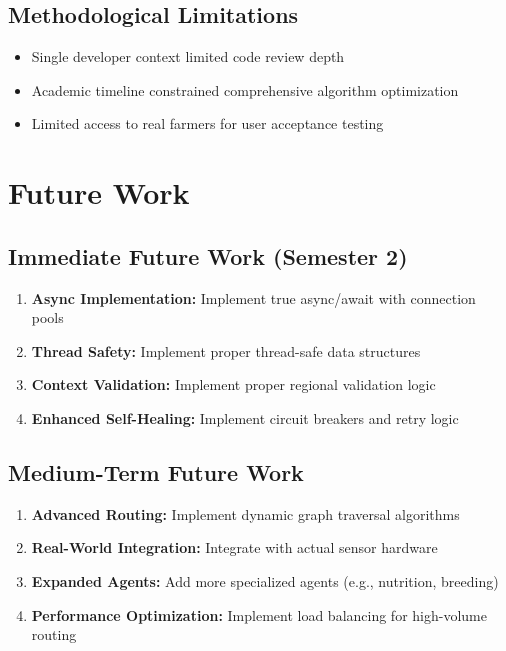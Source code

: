\subsection{Methodological Limitations}

\begin{itemize}
    \item Single developer context limited code review depth
    \item Academic timeline constrained comprehensive algorithm optimization
    \item Limited access to real farmers for user acceptance testing
\end{itemize}

\section{Future Work}

\subsection{Immediate Future Work (Semester 2)}

\begin{enumerate}
    \item \textbf{Async Implementation:} Implement true async/await with connection pools
    \item \textbf{Thread Safety:} Implement proper thread-safe data structures
    \item \textbf{Context Validation:} Implement proper regional validation logic
    \item \textbf{Enhanced Self-Healing:} Implement circuit breakers and retry logic
\end{enumerate}

\subsection{Medium-Term Future Work}

\begin{enumerate}
    \item \textbf{Advanced Routing:} Implement dynamic graph traversal algorithms
    \item \textbf{Real-World Integration:} Integrate with actual sensor hardware
    \item \textbf{Expanded Agents:} Add more specialized agents (e.g., nutrition, breeding)
    \item \textbf{Performance Optimization:} Implement load balancing for high-volume routing
\end{enumerate}

